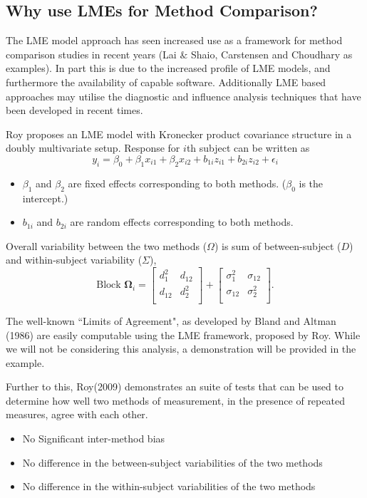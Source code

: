 \documentclass[Chap4main.tex]{subfiles}
\begin{document}
\subsection{Why use LMEs for Method Comparison?}
The LME model approach has seen increased use as a framework for method comparison studies in recent years (Lai $\&$ Shaio, Carstensen and Choudhary as examples). In part this is due to the increased profile of LME models, and furthermore the availability of capable software. Additionally LME based approaches may utilise the diagnostic and influence analysis techniques that have been developed in recent times.


Roy proposes an LME model with Kronecker product covariance structure in a doubly multivariate setup. Response for $i$th subject can be written as
\[ y_i = \beta_0 + \beta_1x_{i1} + \beta_2x_{i2} + b_{1i}z_{i1}  + b_{2i}z_{i2} + \epsilon_i \]
\begin{itemize}
\item $\beta_1$ and $\beta_2$ are fixed effects corresponding to both methods. ($\beta_0$ is the intercept.)
\item $b_{1i}$ and $b_{2i}$ are random effects corresponding to both methods.
\end{itemize}

Overall variability between the two methods ($\Omega$) is sum of between-subject ($D$) and within-subject variability ($\Sigma$),
\[
 \mbox{Block } \boldsymbol{\Omega}_i = \left[ \begin{array}{cc} d^2_1 & d_{12}\\ d_{12} & d^2_2\\ \end{array} \right]
+ \left[\begin{array}{cc} \sigma^2_1 & \sigma_{12}\\ \sigma_{12} & \sigma^2_2\\ \end{array}\right].
\]

The well-known ``Limits of Agreement", as developed by Bland and Altman (1986) are easily computable using the LME framework, proposed by Roy. While we will not be considering this analysis, a demonstration will be provided in the example.

Further to this, Roy(2009) demonstrates an suite of tests that can be used to determine how well two methods of measurement, in the presence of repeated measures, agree with each other.

\begin{itemize}\itemsep0.5cm
\item No Significant inter-method bias
\item No difference in the between-subject variabilities of the two methods
\item No difference in the within-subject variabilities of the two methods
\end{itemize}

\end{document}
